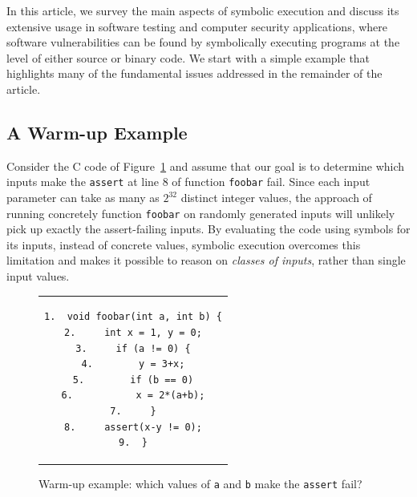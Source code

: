 
In this article, we survey the main aspects of symbolic execution and discuss its extensive usage in software testing and computer security applications, where software vulnerabilities can be found by symbolically executing programs at the level of either source or binary code. We start with a simple example that highlights many of the fundamental issues addressed in the remainder of the article.

\subsection{A Warm-up Example}
\label{symbolic-execution-example}

Consider the C code of Figure~\ref{fig:example-1} and assume that our goal is to determine which inputs make the  {\tt assert} at line 8 of function \texttt{foobar} fail. Since each input parameter can take as many as $2^{32}$ distinct integer values, the approach of running concretely function \texttt{foobar} on randomly generated inputs will unlikely pick up exactly the assert-failing inputs.
By evaluating the code using symbols for its inputs, instead of concrete values, symbolic execution overcomes this limitation and makes it possible to reason on {\em classes of inputs}, rather than single input values. 

\begin{figure}[t]
\begin{center}
\begin{tabular}{c}
\begin{lstlisting}[basicstyle=\ttfamily\small]
1.  void foobar(int a, int b) {
2.     int x = 1, y = 0;
3.     if (a != 0) {
4.        y = 3+x;
5.        if (b == 0)
6.           x = 2*(a+b);
7.     }
8.     assert(x-y != 0);
9.  }
\end{lstlisting}
\end{tabular}
\end{center}
\caption{Warm-up example: which values of \texttt{a} and \texttt{b} make the \texttt{assert} fail?}
\label{fig:example-1}
\end{figure}

